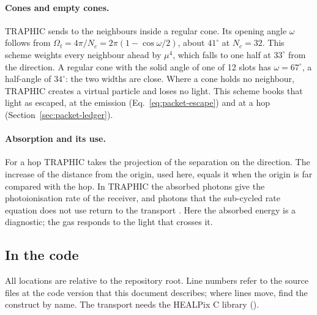 \paragraph{Cones and empty cones.} TRAPHIC sends to the neighbours inside a
regular cone. Its opening angle $\omega$ follows from
$\Omega_t=4\pi/N_c=2\pi(1-\cos\omega/2)$, about $41^\circ$ at $N_c=32$. This
scheme weights every neighbour ahead by $\mu^4$, which falls to one half at
$33^\circ$ from the direction. A regular cone with the solid angle of one of
12 slots has $\omega=67^\circ$, a half-angle of $34^\circ$: the two widths
are close. Where a cone holds no neighbour, TRAPHIC creates a virtual particle
and loses no light. This scheme books that light as escaped, at the emission
(Eq.~\eqref{eq:packet-escape}) and at a hop (Section~\ref{sec:packet-ledger}).

\paragraph{Absorption and its use.} For a hop TRAPHIC takes the projection of
the separation on the direction. The increase of the distance from the origin,
used here, equals it when the origin is far compared with the hop. In TRAPHIC
the absorbed photons give the photoionisation rate of the receiver, and
photons that the sub-cycled rate equation does not use return to the
transport \citep[Section~5.2]{PawlikSchaye2008}. Here the absorbed energy is a
diagnostic; the gas responds to the light that crosses it.

\subsection{In the code}
\label{sec:isrf-code}

All locations are relative to the repository root. Line numbers refer to the
source files at the code version that this document describes; where lines
move, find the construct by name. The
transport needs the HEALPix C library ().


